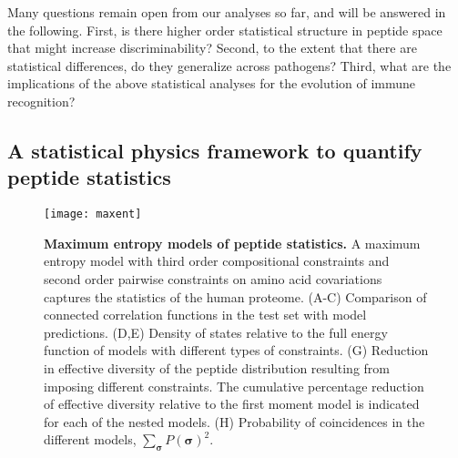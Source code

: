\documentclass[superscriptaddress,twocolumn,pre]{revtex4}
\newcommand{\B}{\boldsymbol}
\newcommand{\<}{\langle}
\renewcommand{\>}{\rangle}
\begin{document}

Many questions remain open from our analyses so far, and will be answered in the following. First, is there higher order statistical structure in peptide space that might increase discriminability? Second, to the extent that there are statistical differences, do they generalize across pathogens? Third, what are the implications of the above statistical analyses for the evolution of immune recognition?


\subsection{A statistical physics framework to quantify peptide statistics} 


\begin{figure*}
    \texttt{[image: maxent]}
        \caption{{\bf Maximum entropy models of peptide statistics.} A maximum entropy model with third order compositional constraints and second order pairwise constraints on amino acid covariations captures the statistics of the human proteome. (A-C) Comparison of connected correlation functions in the test set with model predictions. (D,E) Density of states relative to the full energy function of models with different types of constraints. (G) Reduction in effective diversity of the peptide distribution resulting from imposing different constraints. The cumulative percentage reduction of effective diversity relative to the first moment model is indicated for each of the nested models. (H) Probability of coincidences in the different models, $\sum_{\B \sigma} P(\B \sigma)^2$.
    \label{figmaxent}
    }
\end{figure*}
\end{document}
